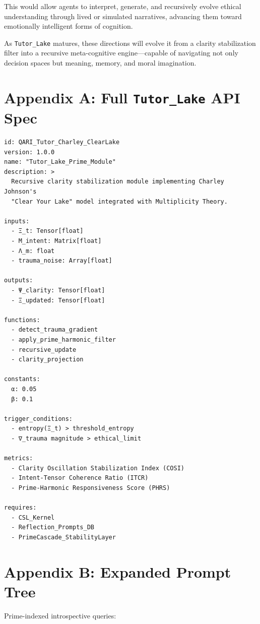 \documentclass[12pt]{article}
\begin{document}
This would allow agents to interpret, generate, and recursively evolve ethical understanding through lived or simulated narratives, advancing them toward emotionally intelligent forms of cognition.

As \texttt{Tutor\_Lake} matures, these directions will evolve it from a clarity stabilization filter into a recursive meta-cognitive engine—capable of navigating not only decision spaces but meaning, memory, and moral imagination.


\nocite{*}




\appendix

\section{Appendix A: Full \texttt{Tutor\_Lake} API Spec}

\begin{verbatim}
id: QARI_Tutor_Charley_ClearLake
version: 1.0.0
name: "Tutor_Lake_Prime_Module"
description: >
  Recursive clarity stabilization module implementing Charley Johnson's
  "Clear Your Lake" model integrated with Multiplicity Theory.

inputs:
  - Ξ_t: Tensor[float]
  - M_intent: Matrix[float]
  - Λ_m: float
  - trauma_noise: Array[float]

outputs:
  - Ψ_clarity: Tensor[float]
  - Ξ_updated: Tensor[float]

functions:
  - detect_trauma_gradient
  - apply_prime_harmonic_filter
  - recursive_update
  - clarity_projection

constants:
  α: 0.05
  β: 0.1

trigger_conditions:
  - entropy(Ξ_t) > threshold_entropy
  - ∇_trauma magnitude > ethical_limit

metrics:
  - Clarity Oscillation Stabilization Index (COSI)
  - Intent-Tensor Coherence Ratio (ITCR)
  - Prime-Harmonic Responsiveness Score (PHRS)

requires:
  - CSL_Kernel
  - Reflection_Prompts_DB
  - PrimeCascade_StabilityLayer
\end{verbatim}

\section{Appendix B: Expanded Prompt Tree}

Prime-indexed introspective queries:
\end{document}
